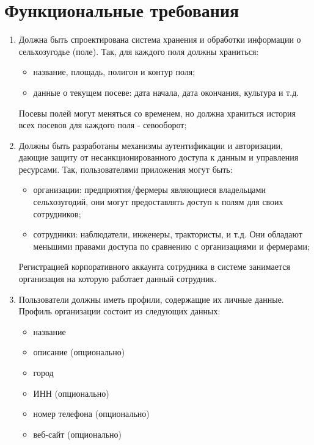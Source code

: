     \section{Функциональные требования} \label{functional}
    
    \begin{enumerate}
        
        \item Должна быть спроектирована система хранения и обработки информации о сельхозугодье (поле). Так, для каждого поля должны храниться:
            \begin{itemize}
                \item название, площадь, полигон и контур поля;
                \item данные о текущем посеве: дата начала, дата окончания, культура и т.д. 
             \end{itemize}
             Посевы полей могут меняться со временем, но должна храниться история всех посевов для каждого поля - севооборот;

        \item Должны быть разработаны механизмы аутентификации и авторизации, дающие защиту от несанкционированного доступа к данным и управления ресурсами. Так, пользователями приложения могут быть:
            \begin{itemize}
                \item организации: предприятия/фермеры являющиеся владельцами сельхозугодий, они могут предоставлять доступ к полям для своих сотрудников;
                \item сотрудники: наблюдатели, инженеры, трактористы, и т.д. Они обладают меньшими правами доступа по сравнению с организациями и фермерами;
            \end{itemize}
            Регистрацией корпоративного аккаунта сотрудника в системе занимается организация на которую работает данный сотрудник.
        
        \item Пользователи должны иметь профили, содержащие их личные данные.
            Профиль организации состоит из следующих данных:
            \begin{itemize}
                \item название
                \item описание (опционально)
                \item город
                \item ИНН (опционально)
                \item номер телефона (опционально)
                \item веб-сайт (опционально)
            \end{itemize}
            

\end{enumerate}
